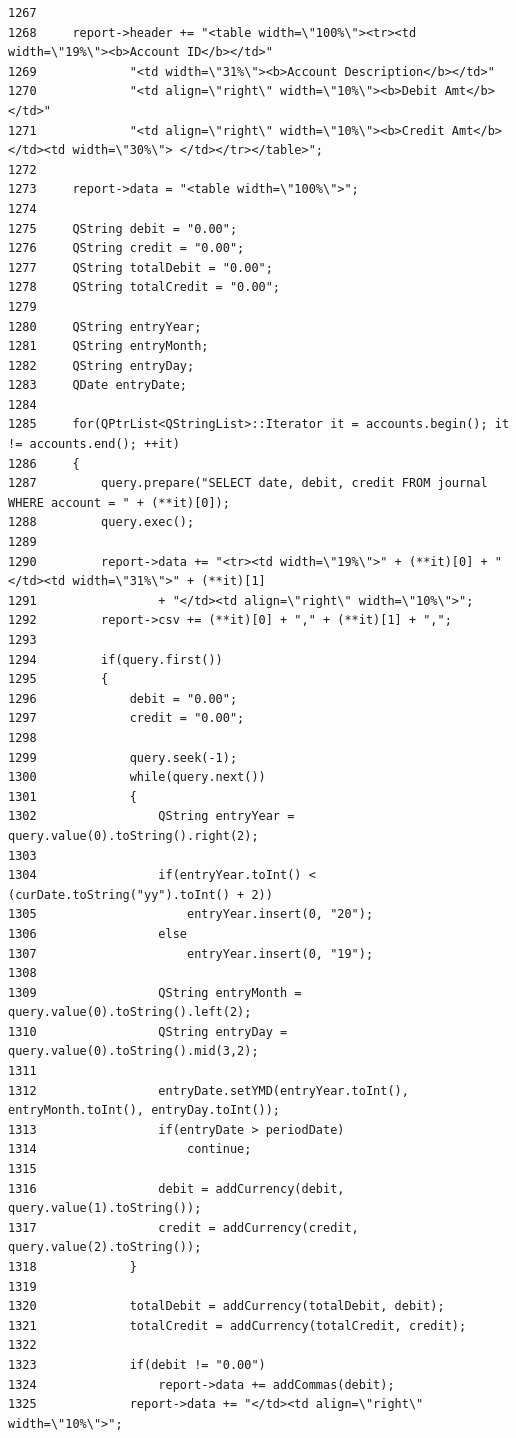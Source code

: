 \begin{verbatim}
1267     
1268     report->header += "<table width=\"100%\"><tr><td width=\"19%\"><b>Account ID</b></td>"
1269             "<td width=\"31%\"><b>Account Description</b></td>"
1270             "<td align=\"right\" width=\"10%\"><b>Debit Amt</b></td>"
1271             "<td align=\"right\" width=\"10%\"><b>Credit Amt</b></td><td width=\"30%\"> </td></tr></table>";
1272 
1273     report->data = "<table width=\"100%\">";
1274     
1275     QString debit = "0.00";
1276     QString credit = "0.00";
1277     QString totalDebit = "0.00";
1278     QString totalCredit = "0.00";
1279     
1280     QString entryYear;
1281     QString entryMonth;
1282     QString entryDay;
1283     QDate entryDate;
1284     
1285     for(QPtrList<QStringList>::Iterator it = accounts.begin(); it != accounts.end(); ++it)
1286     {
1287         query.prepare("SELECT date, debit, credit FROM journal WHERE account = " + (**it)[0]);
1288         query.exec();
1289         
1290         report->data += "<tr><td width=\"19%\">" + (**it)[0] + "</td><td width=\"31%\">" + (**it)[1]
1291                 + "</td><td align=\"right\" width=\"10%\">";
1292         report->csv += (**it)[0] + "," + (**it)[1] + ",";
1293         
1294         if(query.first())
1295         {
1296             debit = "0.00";
1297             credit = "0.00";
1298             
1299             query.seek(-1);
1300             while(query.next())
1301             {
1302                 QString entryYear = query.value(0).toString().right(2);
1303                 
1304                 if(entryYear.toInt() < (curDate.toString("yy").toInt() + 2))
1305                     entryYear.insert(0, "20");
1306                 else
1307                     entryYear.insert(0, "19");
1308                 
1309                 QString entryMonth = query.value(0).toString().left(2);
1310                 QString entryDay = query.value(0).toString().mid(3,2);
1311                 
1312                 entryDate.setYMD(entryYear.toInt(), entryMonth.toInt(), entryDay.toInt());
1313                 if(entryDate > periodDate)
1314                     continue;
1315                 
1316                 debit = addCurrency(debit, query.value(1).toString());
1317                 credit = addCurrency(credit, query.value(2).toString());
1318             }
1319             
1320             totalDebit = addCurrency(totalDebit, debit);
1321             totalCredit = addCurrency(totalCredit, credit);
1322             
1323             if(debit != "0.00")
1324                 report->data += addCommas(debit);
1325             report->data += "</td><td align=\"right\" width=\"10%\">";

\end{verbatim}
